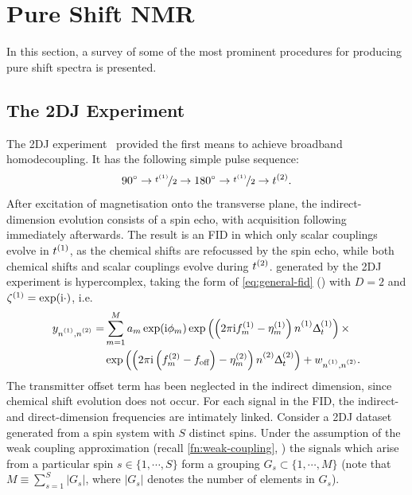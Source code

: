 \section{Pure Shift \acs{NMR}}
In this section, a survey of some of the most prominent procedures for
producing pure shift spectra is presented.
\subsection{The \acs{2DJ} Experiment}
The \ac{2DJ} experiment~\cite{Aue1976, Morris2009} provided the first means to
achieve broadband homodecoupling. It has the following simple pulse sequence:
\[
    \ang{90} \rightarrow \nicefrac{t^{(1)}}{2} \rightarrow \ang{180} \rightarrow \nicefrac{t^{(1)}}{2} \rightarrow t^{(2)}.
\]
After excitation of magnetisation onto the transverse plane, the
indirect-dimension evolution consists of a spin echo, with acquisition
following
immediately afterwards. The result is an \ac{FID} in which only scalar
couplings evolve in $t^{(1)}$, as the chemical shifts are refocussed by the
spin echo, while both chemical shifts and scalar
couplings evolve during $t^{(2)}$.  generated by the \ac{2DJ}
experiment is hypercomplex, taking the form of \cref{eq:general-fid}
() with $D=2$ and $\zeta^{(1)} = \exp(\mathrm{i}\cdot)$, i.e.
\begin{equation}%
    \begin{split}%
        y_{\none,\ntwo} =
        &\sum_{m=1}^{M} a_m \exp(\iu \phi_m)
            \exp\left(\left(2 \pi \iu \fonem - \etaonem\right) \none \Dtone\right) \times \\
        &\exp\left(\left(2 \pi \iu  \left(\ftwom - \foff\right)
            - \etatwom\right) \ntwo \Dttwo\right)
            + w_{\none,\ntwo}.
    \end{split}%
    \label{eq:jres-fid}%
\end{equation}%
The transmitter offset term has been neglected in the indirect dimension, since
chemical shift evolution does not occur.
For each signal in the \ac{FID}, the indirect- and direct-dimension
frequencies are intimately linked. Consider a \ac{2DJ} dataset generated from a
spin system with $S$ distinct spins.
Under the assumption of the
weak coupling approximation (recall \cref{fn:weak-coupling},
    )
the signals which arise
from a particular spin $s \in \lbrace 1, \cdots, S \rbrace$ form a grouping $G_s
\subset \lbrace 1, \cdots, M \rbrace$ (note that $M \equiv \sum_{s=1}^S \lvert
G_s \rvert$, where $\lvert G_s \rvert$ denotes the number of elements in $G_s$).
